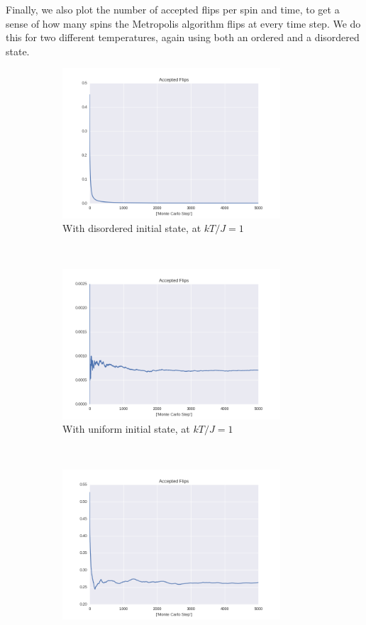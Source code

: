 \documentclass[a4paper, 10pt]{article}
\begin{document}
Finally, we also plot the number of accepted flips per spin and time, to get a sense of how many spins the Metropolis algorithm flips at every time step. We do this for two different temperatures, again using both an ordered and a disordered state.
\begin{figure}[!ht]
    \centering
    \begin{subfigure}[H!]{0.5\textwidth}
        \centering
        \includegraphics[height=2.2in]{flipsWRandomStart.png}
        \caption{With disordered initial state, at $kT/J=1$}
    \end{subfigure}%
    ~ 
    \begin{subfigure}[H!]{0.5\textwidth}
        \centering
        \includegraphics[height=2.2in]{flipsWUpStart.png}
        \caption{With uniform initial state, at $kT/J=1$}
    \end{subfigure}
        ~
     \begin{subfigure}[H!]{0.5\textwidth}
        \centering
        \includegraphics[height=2.2in]{flipsWRandomStartT24.png}

\end{subfigure}
\end{figure}
\end{document}
